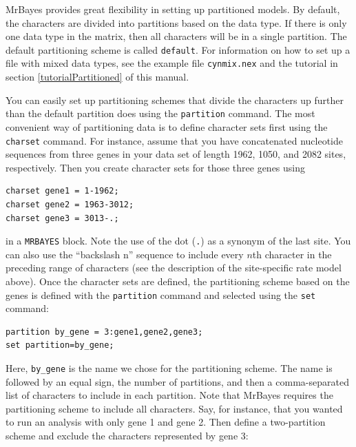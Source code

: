 \documentclass[12pt]{book}
\newcommand{\ttt}[1]{\texttt{#1}}
\begin{document}
MrBayes provides great flexibility in setting up partitioned models. By default, the characters are
divided into partitions based on the data type. If there is only one data type in the matrix, then
all characters will be in a single partition. The default partitioning scheme is called
\ttt{default}. For information on how to set up a file with mixed data types, see the example file
\ttt{cynmix.nex} and the tutorial in section \ref{tutorialPartitioned} of this manual.

You can easily set up partitioning schemes that divide the characters up further than the default
partition does using the \ttt{partition} command. The most convenient way of partitioning data is
to define character sets first using the \ttt{charset} command. For instance, assume that you have
concatenated nucleotide sequences from three genes in your data set of length 1962, 1050, and 2082
sites, respectively. Then you create character sets for those three genes using

\begin{singlespacing}
\small
\begin{verbatim}
charset gene1 = 1-1962;
charset gene2 = 1963-3012;
charset gene3 = 3013-.;
\end{verbatim}
\normalsize
\end{singlespacing}

in a \ttt{MRBAYES} block. Note the use of the dot (\ttt{.}) as a synonym of the last site. You can
also use the ``backslash n'' sequence to include every $n$th character in the preceding range of
characters (see the description of the site-specific rate model above). Once the character sets are
defined, the partitioning scheme based on the genes is defined with the \ttt{partition} command and
selected using the \ttt{set} command:

\begin{singlespacing}
\small
\begin{verbatim}
partition by_gene = 3:gene1,gene2,gene3;
set partition=by_gene;
\end{verbatim}
\normalsize
\end{singlespacing}

Here, \ttt{by\_gene} is the name we chose for the partitioning scheme. The name is followed by an
equal sign, the number of partitions, and then a comma-separated list of characters to include in
each partition. Note that MrBayes requires the partitioning scheme to include all characters. Say,
for instance, that you wanted to run an analysis with only gene 1 and gene 2. Then define a
two-partition scheme and exclude the characters represented by gene 3:
\end{document}

